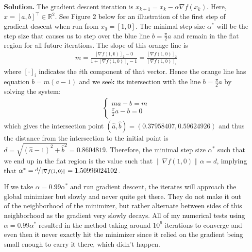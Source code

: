 \documentclass{letter}
\newcommand{\Solution}[1]{%
	\textbf{Solution.} #1 \par%
}
\newcommand{\T}{\intercal}
\newcommand{\R}{\mathbb{R}}
\begin{document}
    \Solution{The gradient descent iteration is $x_{k+1} = x_k - \alpha \nabla f(x_k)$. Here, $x = [a, b]^\T \in \R^2$. See Figure 2 below for an illustration of the first step of gradient descent when run from $x_0 = [1, 0]$. The minimal step size $\alpha^*$ will be the step size that causes us to step over the blue line $b = \frac{\pi}{2}a$ and remain in the flat region for all future iterations. The slope of this orange line is \begin{align*}
        m = \frac{[\nabla f(1,0)]_2 - 0}{1 + [\nabla f(1,0)]_1 - 1} = \frac{[\nabla f(1,0)]_2}{[\nabla f(1,0)]_1}
    \end{align*} where $[\cdot]_i$ indicates the $i$th component of that vector. Hence the orange line has equation $b = m(a-1)$ and we seek its intersection with the line $b = \frac{\pi}{2}a$ by solving the system: \begin{align*}
        \begin{cases}
            ma - b = m \\
            \frac{\pi}{2}a - b = 0
        \end{cases}
    \end{align*} which gives the intersection point $(\hat{a}, \hat{b}) = (0.37958407, 0.59624926)$ and thus the distance from the intersection to the initial point is $d = \sqrt{(\hat{a} - 1)^2 + \hat{b}^2} = 0.8604819$. Therefore, the minimal step size $\alpha^*$ such that we end up in the flat region is the value such that $\|\nabla f(1, 0)\|\alpha = d$, implying that $\alpha^* = \sfrac{d}{\|\nabla f(1, 0)\|} = 1.50996024102$. 
    
    If we take $\alpha = 0.99\alpha^*$ and run gradient descent, the iterates will approach the global minimizer but slowly and never quite get there. They do not make it out of the neighborhood of the minimizer, but rather alternate between sides of this neighborhood as the gradient very slowly decays. All of my numerical tests using $\alpha = 0.99\alpha^*$ resulted in the method taking around $10^6$ iterations to converge and even then it never exactly hit the minimizer since it relied on the gradient being small enough to carry it there, which didn't happen. 
    
}
\end{document}
